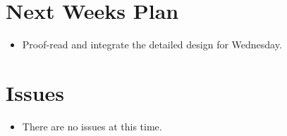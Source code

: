 %
%
%
\section{Next Weeks Plan}
\begin{itemize}
	\item Proof-read and integrate the detailed design for Wednesday.
\end{itemize}

%
%
%
\section{Issues}
\begin{itemize}
	\item There are no issues at this time.
\end{itemize}





